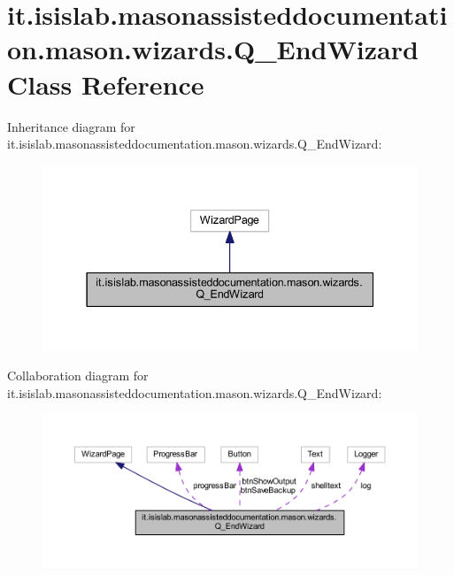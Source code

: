 \hypertarget{classit_1_1isislab_1_1masonassisteddocumentation_1_1mason_1_1wizards_1_1_q___end_wizard}{\section{it.\-isislab.\-masonassisteddocumentation.\-mason.\-wizards.\-Q\-\_\-\-End\-Wizard Class Reference}
\label{classit_1_1isislab_1_1masonassisteddocumentation_1_1mason_1_1wizards_1_1_q___end_wizard}
}


Inheritance diagram for it.\-isislab.\-masonassisteddocumentation.\-mason.\-wizards.\-Q\-\_\-\-End\-Wizard\-:\nopagebreak
\begin{figure}[H]
\begin{center}
\leavevmode
\includegraphics[width=337pt]{classit_1_1isislab_1_1masonassisteddocumentation_1_1mason_1_1wizards_1_1_q___end_wizard__inherit__graph}
\end{center}
\end{figure}


Collaboration diagram for it.\-isislab.\-masonassisteddocumentation.\-mason.\-wizards.\-Q\-\_\-\-End\-Wizard\-:
\nopagebreak
\begin{figure}[H]
\begin{center}
\leavevmode
\includegraphics[width=350pt]{classit_1_1isislab_1_1masonassisteddocumentation_1_1mason_1_1wizards_1_1_q___end_wizard__coll__graph}
\end{center}
\end{figure}
